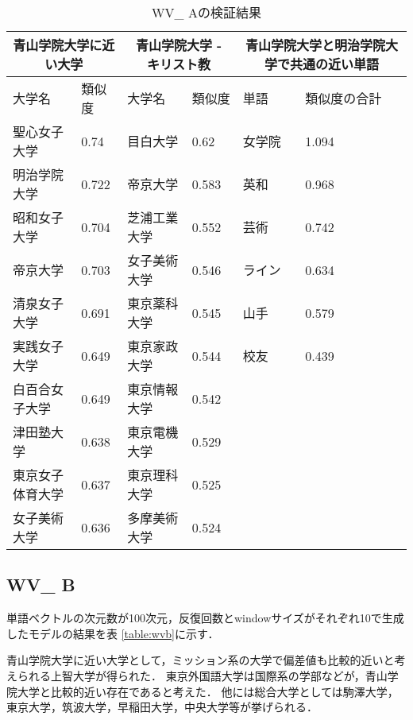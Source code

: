 \begin{table}[H]
\caption{WV\_ Aの検証結果}
\centering
\footnotesize
\begin{tabular}{ll|ll|ll}
\hline
\multicolumn{2}{c}{青山学院大学に近い大学} & \multicolumn{2}{c}{青山学院大学 - キリスト教} & \multicolumn{2}{c}{青山学院大学と明治学院大学で共通の近い単語}
\\ \hline
大学名 & 類似度 & 大学名 & 類似度 & 単語 & 類似度の合計
\\ \hline \hline
聖心女子大学 & 0.74 & 目白大学 & 0.62 & 女学院 & 1.094\\
明治学院大学 & 0.722 & 帝京大学 & 0.583 & 英和 & 0.968\\
昭和女子大学 & 0.704 & 芝浦工業大学 & 0.552 & 芸術 & 0.742\\
帝京大学 & 0.703 & 女子美術大学 & 0.546 & ライン & 0.634\\
清泉女子大学 & 0.691 & 東京薬科大学 & 0.545 & 山手 & 0.579\\
実践女子大学 & 0.649 & 東京家政大学 & 0.544 & 校友 & 0.439\\
白百合女子大学 & 0.649 & 東京情報大学 & 0.542 & & \\
津田塾大学 & 0.638 & 東京電機大学 & 0.529 & & \\
東京女子体育大学 & 0.637 & 東京理科大学 & 0.525 & & \\
女子美術大学 & 0.636 & 多摩美術大学 & 0.524 & & \\ \hline
\end{tabular}
\label{table:wva}
\end{table}



\subsection{WV\_ B}
単語ベクトルの次元数が100次元，反復回数とwindowサイズがそれぞれ10で生成したモデルの結果を表 \ref{table:wvb}に示す．

青山学院大学に近い大学として，ミッション系の大学で偏差値も比較的近いと考えられる上智大学が得られた．
東京外国語大学は国際系の学部などが，青山学院大学と比較的近い存在であると考えた．
他には総合大学としては駒澤大学，東京大学，筑波大学，早稲田大学，中央大学等が挙げられる．


